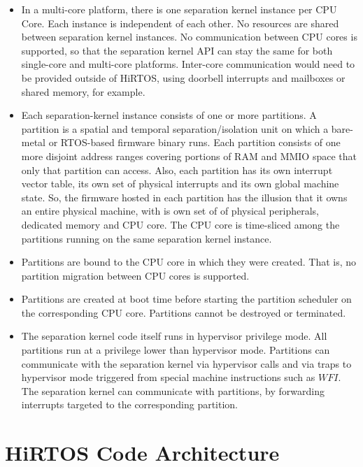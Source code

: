 \documentclass[11pt,letterpaper,twoside,openany]{book}
\begin{document}
\begin{itemize}

\item In a multi-core platform, there is one separation kernel instance per CPU Core. Each instance is
independent of each other. No resources are shared between separation kernel instances. No communication between
CPU cores is supported, so that the separation kernel API can stay the same for both single-core
and multi-core platforms. Inter-core communication would need to be provided outside of HiRTOS,
using doorbell interrupts and mailboxes or shared memory, for example.

\item Each separation-kernel instance consists of one or more partitions. A partition is a spatial and temporal
separation/isolation unit on which a bare-metal or RTOS-based firmware binary runs. Each partition
consists of one more disjoint address ranges covering portions of RAM and MMIO space that only that
partition can access. Also, each partition has its own interrupt vector table, its own set of physical
interrupts and its own global machine state. So, the firmware hosted in each partition has the illusion
that it owns an entire physical machine, with is own set of of physical peripherals, dedicated memory
and CPU core. The CPU core is time-sliced among the partitions running on the same separation kernel instance.

\item
Partitions are bound to the CPU core in which they were created. That is, no partition migration between
CPU cores is supported.

\item
Partitions are created at boot time before starting the partition scheduler on the corresponding CPU core.
Partitions cannot be destroyed or terminated.

\item
The separation kernel code itself runs in hypervisor privilege mode. All partitions run at a privilege lower
than hypervisor mode. Partitions can communicate with the separation kernel via hypervisor calls and via
traps to hypervisor mode triggered from special machine instructions such as $WFI$. The separation kernel
can communicate with partitions, by forwarding interrupts targeted to the corresponding partition.

\end{itemize}

\section{HiRTOS Code Architecture}
\end{document}

